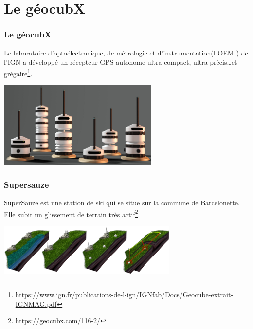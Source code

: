 \documentclass[svgnames,11pt]{beamer}
\begin{document}
\section{Le géocubX}
\begin{frame}
    \frametitle{Le géocubX}

    Le laboratoire d'optoélectronique, de métrologie et d’instrumentation(LOEMI) de l'IGN a développé un récepteur GPS autonome ultra-compact, ultra-précis\dots et grégaire\footnote{\url{https://www.ign.fr/publications-de-l-ign/IGNfab/Docs/Geocube-extrait-IGNMAG.pdf}}.
\begin{center}
\centering
\includegraphics[width=8cm]{ressources/geocubx.jpg}
\end{center}

\end{frame}
\begin{frame}
    \frametitle{Supersauze}

    SuperSauze est une station de ski qui se situe sur la commune de Barcelonette. Elle subit un glissement de terrain très actif\footnote{\url{https://geocubx.com/116-2/}}.
    \begin{center}
    \centering
    \includegraphics[width=9cm]{ressources/supersauze.png}
    \label{IMG}
    \end{center}

\end{frame}
\end{document}
